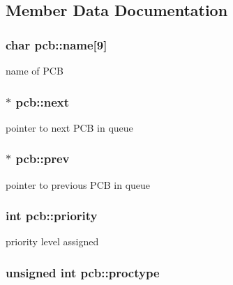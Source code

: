 \subsection{Member Data Documentation}
\hypertarget{structpcb_a360b3d707c6418dc8008771f43196964}{}
\subsubsection[{name}]{\setlength{\rightskip}{0pt plus 5cm}char pcb\+::name\mbox{[}9\mbox{]}}\label{structpcb_a360b3d707c6418dc8008771f43196964}


name of P\+C\+B 

\hypertarget{structpcb_a4c8a53ac3e0acb802d447066865a22f7}{}
\subsubsection[{next}]{$\ast$ pcb\+::next}\label{structpcb_a4c8a53ac3e0acb802d447066865a22f7}


pointer to next P\+C\+B in queue 

\hypertarget{structpcb_a2d692e41a254446edf9a1d2d0a5a18de}{}
\subsubsection[{prev}]{$\ast$ pcb\+::prev}\label{structpcb_a2d692e41a254446edf9a1d2d0a5a18de}


pointer to previous P\+C\+B in queue 

\hypertarget{structpcb_a1850f2ea7807c7368c02f0062bfa33ca}{}
\subsubsection[{priority}]{\setlength{\rightskip}{0pt plus 5cm}int pcb\+::priority}\label{structpcb_a1850f2ea7807c7368c02f0062bfa33ca}


priority level assigned 

\hypertarget{structpcb_ae911612e25b572ed39b43d31a8671b4b}{}
\subsubsection[{proctype}]{\setlength{\rightskip}{0pt plus 5cm}unsigned int pcb\+::proctype}\label{structpcb_ae911612e25b572ed39b43d31a8671b4b}


